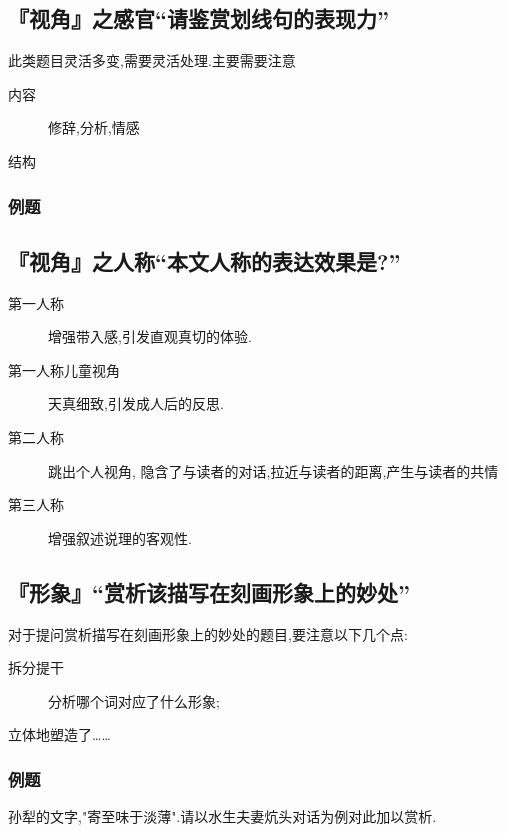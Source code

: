 \documentclass{ctexart}
\begin{document}
\subsection{『视角』之感官``请鉴赏划线句的表现力''}

此类题目灵活多变,需要灵活处理.主要需要注意

\begin{description}
	\item[内容] 修辞,分析,情感
	\item[结构]
\end{description}

\subsubsection{例题}

\subsection{『视角』之人称``本文人称的表达效果是?''}

\begin{description}
	\item[第一人称] 增强带入感,引发直观真切的体验.
	\item[第一人称儿童视角] 天真细致,引发成人后的反思.
	\item[第二人称] 跳出个人视角, 隐含了与读者的对话,拉近与读者的距离,产生与读者的共情
	\item[第三人称] 增强叙述说理的客观性.
\end{description}

\subsection{『形象』``赏析该描写在刻画形象上的妙处''}
\large

对于提问赏析描写在刻画形象上的妙处的题目,要注意以下几个点:

\begin{description}
	\item[拆分提干] 分析哪个词对应了什么形象;
	\item[立体地塑造了……]
\end{description}

\subsubsection{例题}

\large
孙犁的文字,"寄至味于淡薄".请以水生夫妻炕头对话为例对此加以赏析.
\end{document}
